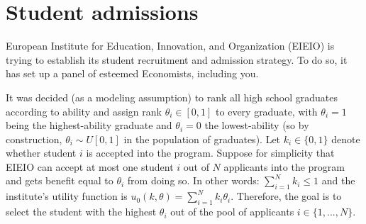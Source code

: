 \documentclass[a4paper]{article}
\newif\ifsolutions
\begin{document}
\ifsolutions
\subsection*{Solution}
\begin{enumerate}
	\item Since both players have perfectly aligned interests, Mary can offer Mark to simply choose any $(k,t)$ he prefers. Mark will choose an option that maximizes $u_1$ given $\theta$, hence it will also maximize Mary's utility $u_0$.
	
	We can find $(k(\theta),t(\theta))$ that maximize Mark's utility $u_1$ given $\theta$, subject to the funding constraint $t(\theta) \geq p k(\theta)$:
	\begin{align*}
		(k^*(\theta),t^*(\theta)) &\in \arg\max_{k,t} \left\{ \sqrt{\theta k} - t \right\}
		\\
		\text{s.t. } & t \geq p k.
		\\
		\Rightarrow 
		t^*(\theta) &= p k^*(\theta),
		\\
		k^*(\theta) &\in \arg\max_{k} \left\{ \sqrt{\theta k} - pk \right\}
		\\
		\Rightarrow
		k^*(\theta) &= \frac{\theta}{4p^2}.
	\end{align*}
	So the optimal direct mechanism is given by $(k^*(\theta),t^*(\theta)) = \left( \frac{\theta}{4p^2}, \frac{\theta}{4p} \right)$.
	
	\item As mentioned above, Mary can simply let Mark name the amount $t$ he would like to borrow, and let him go buy KEX chocolate wafers with all of the named amount. An even less direct mechanism would be to give Mark direct access to Mary's credit card or any other payment method for sake of this purchase.
\end{enumerate}
\fi



\section{Student admissions}
European Institute for Education, Innovation, and Organization (EIEIO) is trying to establish its student recruitment and admission strategy. To do so, it has set up a panel of esteemed Economists, including you.

It was decided (as a modeling assumption) to rank all high school graduates according to ability and assign rank $\theta_i \in [0,1]$ to every graduate, with $\theta_i=1$ being the highest-ability graduate and $\theta_i=0$ the lowest-ability (so by construction, $\theta_i \sim U[0,1]$ in the population of graduates).
Let $k_i \in \{0,1\}$ denote whether student $i$ is accepted into the program. Suppose for simplicity that EIEIO can accept at most one student $i$ out of $N$ applicants into the program and gets benefit equal to $\theta_i$ from doing so. In other words: $\sum_{i=1}^N k_i \leq 1$ and the institute's utility function is $u_0(k,\theta) = \sum_{i=1}^N k_i \theta_i$. Therefore, the goal is to select the student with the highest $\theta_i$ out of the pool of applicants $i \in \{1,...,N\}$.
\end{document}
